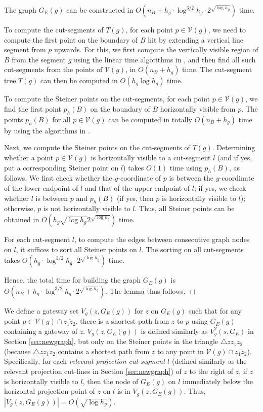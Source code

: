 \documentclass[english,runningheads,11pt]{llncs}
\def\calV{\mathcal{V}}
\newenvironment{proof}{\noindent {\textbf{Proof:}}\rm}{\hfill $\Box$\rm}
\begin{document}
\begin{lemma}\label{lem:120}
The graph $G_E(g)$ can be constructed in
$O(n_B+h_g\cdot \log^{3/2} h_g \cdot 2^{\sqrt{\log h_g}})$ time.
\end{lemma}
\begin{proof}
To compute the cut-segments of $T(g)$, for each point $p\in \calV(g)$, we need to
compute the first point on the boundary of $B$ hit by extending a
vertical line segment from $p$ upwards.
For this, we first compute the vertically visible region of $B$ from the segment $g$
using the linear time algorithms in \cite{ref:JoeCo87,ref:LeeVi83}, and then
find all such cut-segments from the points of $\calV(g)$, in $O(n_B+h_g)$ time.
The cut-segment tree $T(g)$ can then be computed in
$O(h_g\log h_g)$ time.

To compute the Steiner points on the cut-segments, for each point
$p\in \calV(g)$, we find the first point $p_h(B)$ on the boundary of $B$
horizontally visible from $p$.
The points $p_h(B)$ for all $p\in \calV(g)$ can be computed in totally
$O(n_B+h_g)$ time by using the algorithms in \cite{ref:JoeCo87,ref:LeeVi83}.

Next, we compute the Steiner points on the cut-segments of $T(g)$.
Determining whether a point $p\in \calV(g)$ is
horizontally visible to a cut-segment $l$ (and if yes, put a
corresponding Steiner point on $l$) takes $O(1)$ time using
$p_h(B)$, as follows. We first check whether the $y$-coordinate of $p$ is between the
$y$-coordinate of the lower endpoint of $l$ and that of the upper
endpoint of $l$; if yes, we check whether $l$ is between $p$ and
$p_h(B)$ (if yes, then $p$ is horizontally visible to $l$);
otherwise, $p$ is not horizontally visible to $l$.
Thus, all Steiner
points can be obtained in $O(h_g \sqrt{\log h_g}2^{\sqrt{\log h_g}})$ time.

For each cut-segment $l$, to compute the edges between consecutive graph nodes
on $l$, it suffices to sort all Steiner points on
$l$. The sorting on all cut-segments takes $O(h_g\cdot \log^{3/2}h_g\cdot
2^{\sqrt{\log h_g}})$ time.

Hence, the total time for building the graph $G_E(g)$ is $O(n_B+h_g\cdot
\log^{3/2}h_g\cdot 2^{\sqrt{\log h_g}})$.
The lemma thus follows.
\end{proof}



We define a gateway set $V_g(z,G_E(g))$ for $z$ on $G_E(g)$ such that
for any point $p\in \calV(g)\cap \overline{z_1z_2}$,
there is a shortest path from $z$ to
$p$ using $G_E(g)$ containing a gateway of $z$.
$V_g(z,G_E(g))$ is defined similarly as $V^2_g(s,G_E)$ in Section \ref{sec:newgraph},
but only on the Steiner points in the triangle $\triangle zz_1z_2$
(because $\triangle zz_1z_2$ contains a shortest path
from $z$ to any point in $\calV(g)\cap \overline{z_1z_2}$). Specifically, for each
{\em relevant projection cut-segment} $l$  (defined similarly as the
relevant projection cut-lines in Section \ref{sec:newgraph})
of $z$ to the right of $z$, if $z$ is horizontally visible
to $l$, then the node of $G_E(g)$ on $l$ immediately below the horizontal projection
point of $z$ on $l$ is in $V_g(z,G_E(g))$. Thus,
$|V_g(z,G_E(g))|=O(\sqrt{\log h_g})$.
\end{document}
